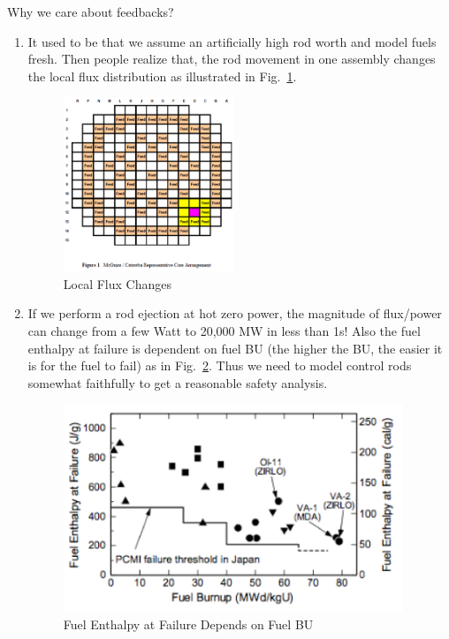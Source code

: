 \documentclass{school-22.211-notes}
\date{April 30, 2012}
\begin{document}
\maketitle

 \label{PKE-with-feedback}
Why we care about feedbacks? 
\begin{enumerate}
\item It used to be that we assume an artificially high rod worth and model fuels fresh. Then people realize that, the rod movement in one assembly changes the local flux distribution as illustrated in Fig.~\ref{local-flux-changes}. 
  \begin{figure}[ht]
    \centering
    \includegraphics[width=2in]{images/pke/local-flux-changes.png}
    \caption{Local Flux Changes} \label{local-flux-changes}
  \end{figure}

\item If we perform a rod ejection at hot zero power, the magnitude of flux/power can change from a few Watt to 20,000 MW in less than 1s! Also the fuel enthalpy at failure is dependent on fuel BU (the higher the BU, the easier it is for the fuel to fail) as in Fig.~\ref{failure-depend-on-BU}. Thus we need to model control rods somewhat faithfully to get a reasonable safety analysis. 
  \begin{figure}[ht]
    \centering
    \includegraphics[width=4in]{images/pke/failure-depend-on-BU.png}
    \caption{Fuel Enthalpy at Failure Depends on Fuel BU} \label{failure-depend-on-BU}
  \end{figure}


\end{enumerate}
\end{document}
